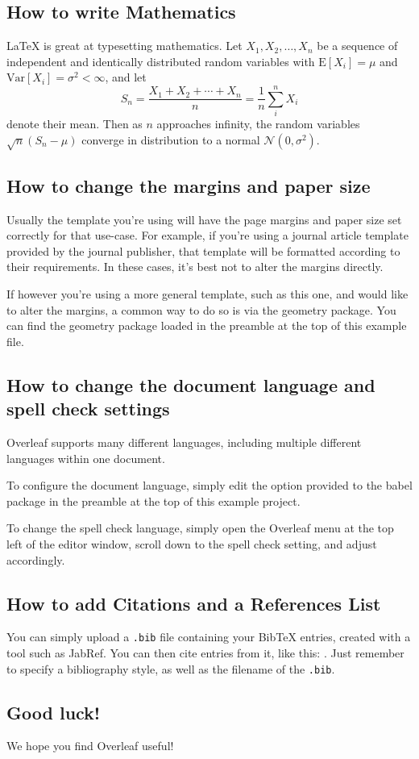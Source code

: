 \documentclass{article}
\begin{document}
\subsection{How to write Mathematics}

\LaTeX{} is great at typesetting mathematics. Let $X_1, X_2, \ldots, X_n$ be a sequence of independent and identically distributed random variables with $\text{E}[X_i] = \mu$ and $\text{Var}[X_i] = \sigma^2 < \infty$, and let
\[S_n = \frac{X_1 + X_2 + \cdots + X_n}{n}
= \frac{1}{n}\sum_{i}^{n} X_i\]
denote their mean. Then as $n$ approaches infinity, the random variables $\sqrt{n}(S_n - \mu)$ converge in distribution to a normal $\mathcal{N}(0, \sigma^2)$.

\subsection{How to change the margins and paper size}

Usually the template you're using will have the page margins and paper size set correctly for that use-case. For example, if you're using a journal article template provided by the journal publisher, that template will be formatted according to their requirements. In these cases, it's best not to alter the margins directly.

If however you're using a more general template, such as this one, and would like to alter the margins, a common way to do so is via the geometry package. You can find the geometry package loaded in the preamble at the top of this example file.

\subsection{How to change the document language and spell check settings}

Overleaf supports many different languages, including multiple different languages within one document.

To configure the document language, simply edit the option provided to the babel package in the preamble at the top of this example project.

To change the spell check language, simply open the Overleaf menu at the top left of the editor window, scroll down to the spell check setting, and adjust accordingly.

\subsection{How to add Citations and a References List}

You can simply upload a \verb|.bib| file containing your BibTeX entries, created with a tool such as JabRef. You can then cite entries from it, like this: \cite{greenwade93}. Just remember to specify a bibliography style, as well as the filename of the \verb|.bib|.

\subsection{Good luck!}

We hope you find Overleaf useful!



\end{document}
